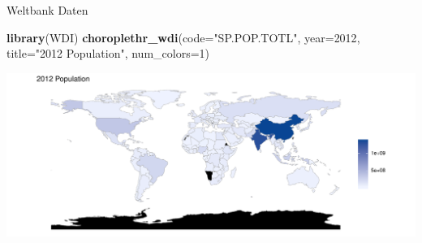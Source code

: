 \documentclass[ignorenonframetext,]{beamer}
\newenvironment{Shaded}{\begin{snugshade}}{\end{snugshade}}
\newcommand{\KeywordTok}[1]{\textcolor[rgb]{0.13,0.29,0.53}{\textbf{#1}}}
\newcommand{\DataTypeTok}[1]{\textcolor[rgb]{0.13,0.29,0.53}{#1}}
\newcommand{\DecValTok}[1]{\textcolor[rgb]{0.00,0.00,0.81}{#1}}
\newcommand{\StringTok}[1]{\textcolor[rgb]{0.31,0.60,0.02}{#1}}
\newcommand{\NormalTok}[1]{#1}
\begin{document}
\begin{frame}[fragile]{Weltbank Daten}

\begin{Shaded}
\begin{Highlighting}[]
\KeywordTok{library}\NormalTok{(WDI) }
\KeywordTok{choroplethr_wdi}\NormalTok{(}\DataTypeTok{code=}\StringTok{"SP.POP.TOTL"}\NormalTok{, }\DataTypeTok{year=}\DecValTok{2012}\NormalTok{, }
                \DataTypeTok{title=}\StringTok{"2012 Population"}\NormalTok{, }
                \DataTypeTok{num_colors=}\DecValTok{1}\NormalTok{)}
\end{Highlighting}
\end{Shaded}

\includegraphics{slides_all2gether_part1_files/figure-beamer/unnamed-chunk-127-1.pdf}

\end{frame}
\end{document}
